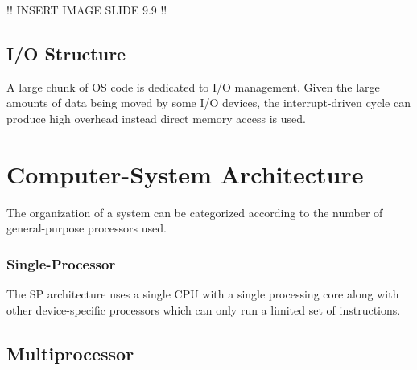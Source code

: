 	!! INSERT IMAGE SLIDE 9.9 !!


	\subsection{I/O Structure}

	\par{A large chunk of OS code is dedicated to I/O management. Given the large amounts of data being moved by some I/O devices, the interrupt-driven cycle can produce high overhead instead direct memory access is used.}


\section{Computer-System Architecture}

	\par{The organization of a system can be categorized according to the number of general-purpose processors used.}




	\subsubsection{Single-Processor}

	\par{The SP architecture uses a single CPU with a single processing core along with other device-specific processors which can only run a limited set of instructions.}


	\subsection{Multiprocessor}

